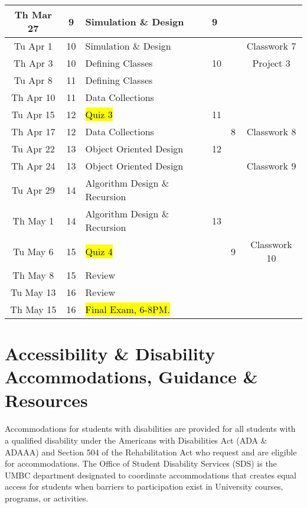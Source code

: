 \documentclass[letter,10pt]{article}
\begin{document}
\begin{tabular}{c c l l l c}
Th Mar 27  & 9 & Simulation \& Design & 9 & & \\ \hline
Tu Apr 1     & 10 & Simulation \& Design & & & Classwork 7 \\ 
Th Apr 3     & 10 & Defining Classes & 10 & & Project 3\\
Tu Apr 8     & 11 & Defining Classes & & & \\
Th Apr 10   & 11 & Data Collections & & & \\
Tu Apr 15   & 12 & \hl{Quiz 3}  & 11 & &  \\
Th Apr 17   & 12 & Data Collections & & 8 & Classwork 8\\
Tu Apr 22   & 13 & Object Oriented Design & 12 & & \\
Th Apr 24   & 13 & Object Oriented Design & & & Classwork 9 \\
Tu Apr 29   & 14 & Algorithm Design \& Recursion & & & \\ \hline
Th May 1    & 14 & Algorithm Design \& Recursion & 13 & & \\
Tu May 6    & 15 & \hl{Quiz 4} & & 9 & Classwork 10 \\
Th May 8    & 15 & Review & & & \\
Tu May 13  & 16 & Review & & & \\
Th May 15  & 16 & \hl{Final Exam, 6-8PM.} & & & \\
\end{tabular}

\section*{Accessibility \& Disability Accommodations, Guidance \& Resources}
\paragraph{}Accommodations for students with disabilities are provided for all students with a qualified disability under the Americans with Disabilities Act (ADA \& ADAAA) and Section 504 of the Rehabilitation Act who request and are eligible for accommodations. The Office of Student Disability Services (SDS) is the UMBC department designated to coordinate accommodations that creates equal access for students when barriers to participation exist in University courses, programs, or activities.
\end{document}
